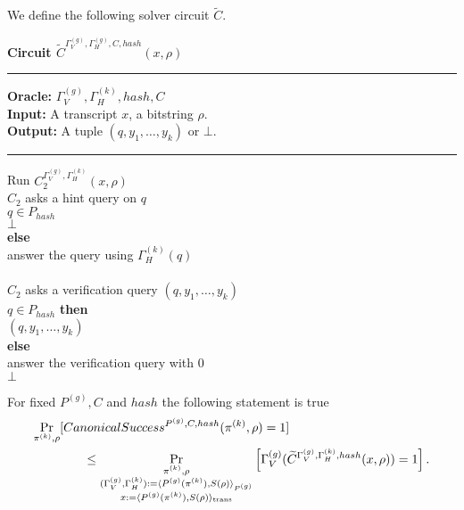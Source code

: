%
\newcommand{\prGx}{(\Gamma_V,\Gamma_H) := \langle P^{(1)}(\pi^*), D_1(\rho) \rangle_{P^{(1)}} \\ x^* := \langle P^{(1)}(\pi^*), D_1(\rho) \rangle_{\text{trans}}}
%
We define the following solver circuit $\widetilde{C}$.
\begin{codeblock}
  \textbf{Circuit $\widetilde{C}^{\Gamma_V^{(g)}, \Gamma_H^{(g)}, C, hash} (x, \rho)$}
  \medskip \hrule \medskip
  \textbf{Oracle:} $\Gamma_V^{(g)}, \Gamma_H^{(k)}, hash, C$ \\
  \textbf{Input:} A transcript $x$, a bitstring $\rho$. \\
  \textbf{Output:} A tuple $(q, y_1, \dots, y_k)$ or $\bot$.
  \medskip\hrule\medskip
  Run $C_2^{\Gamma_V^{(g)},\Gamma_H^{(k)}}(x, \rho)$ \\
  \IndI \If $C_2$ asks a hint query on $q$ \then\\
  \IndII \If $q \in P_{hash}$ \then\\
  \IndIII \return $\bot$\\
  \IndII \textbf{else}\\
  \IndIII answer the query using $\Gamma_H^{(k)}(q)$\\
  \\
  \IndI \If $C_2$ asks a verification query $(q, y_1, \dots, y_k)$ \then \\
  \IndII \If $q \in P_{hash}$ \textbf{then} \\
  \IndIII \return $(q, y_1, \dots, y_k)$ \\
  \IndII \textbf{else} \\
  \IndIII answer the verification query with 0 \\
  \return $\bot$
\end{codeblock}
%
\begin{lemma}
  \label{lemma:ctilda_c}
  For fixed $P^{(g)}, C$ and $hash$ the following statement is true
  \begin{align*}
    &\underset{\pi^{(k)}, \rho}{\Pr}[CanonicalSuccess^{P^{(g)}, C, hash}(\pi^{(k)}, \rho) = 1] \\
    &\mbox\qquad\qquad \leq \underset{\substack{ \pi^{(k)}, \rho \\
        (\Gamma_V^{(g)}, \Gamma_H^{(k)}) := \langle P^{(g)}(\pi^{(k)}), S(\rho) \rangle_{P^{(g)}} \\
        x:= \langle P^{(g)}(\pi^{(k)}), S(\rho) \rangle_{\text{trans}}}}
  {\Pr}\left[\Gamma_V^{(g)} (\widetilde{C}^{\Gamma_V^{(g)}, \Gamma_H^{(k)}, hash}(x, \rho)) = 1\right].
  \end{align*}
\end{lemma}
